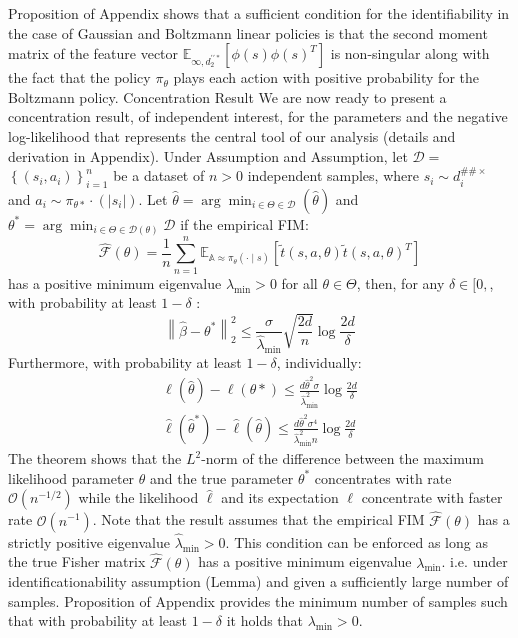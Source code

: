 \documentclass{article}
\begin{document}
Proposition of Appendix shows that a sufficient condition for the identifiability in the case of Gaussian and Boltzmann linear policies is that the second moment matrix of the feature vector \(\mathbb{E}_{\infty, d_{2}^{\prime \prime \ast}}\left[\phi(s) \phi(s)^{T}\right]\) is non-singular along with the fact that the policy \(\pi_{\theta}\) plays each action with positive probability for the Boltzmann policy.
Concentration Result We are now ready to present a concentration result, of independent interest, for the parameters and the negative log-likelihood that represents the central tool of our analysis (details and derivation in Appendix).
Under Assumption and Assumption, let \(\mathcal{D}=\) \(\left\{\left(s_{i}, a_{i}\right)\right\}_{i=1}^{n}\) be a dataset of \(n>0\) independent samples, where \(s_{i} \sim d_{i}^{\# \# \times}\) and \(a_{i} \sim \pi_{\theta *} \cdot\left(\left|s_{i}\right|\right)\). Let \(\hat{\theta}=\arg \min _{i \in \Theta \in \mathcal{D}}(\hat{\theta})\) and \(\theta^{*}=\arg \min _{i \in \Theta \in \mathcal{D}(\theta)} \mathcal{D}\) if the empirical FIM:
\[
\widehat{\mathcal{F}}(\theta)=\frac{1}{n} \sum_{n=1}^{n} \mathbb{E}_{\mathbb{A} \approx \pi_{\theta}(\cdot \mid s)}\left[\tilde{t}(s, a, \theta) \tilde{t}(s, a, \theta)^{T}\right]
\]
has a positive minimum eigenvalue \(\hat{\lambda}_{\min }>0\) for all \(\theta \in \Theta\), then, for any \(\delta \in[0,\), with probability at least \(1-\delta\) :
\[
\left\|\hat{\beta}-\theta^{*}\right\|_{2}^{2} \leq \frac{\sigma}{\hat{\lambda}_{\min }} \sqrt{\frac{2 d}{n}} \log \frac{2 d}{\delta}
\]
Furthermore, with probability at least \(1-\delta\), individually:
\[
\begin{array}{l}
\ell(\hat{\theta})-\ell(\theta *) \leqslant \frac{d \hat{\theta}^{2} \sigma}{\hat{\lambda}_{\min }^{2}} \log \frac{2 d}{\delta} \\
\widehat{\ell}(\hat{\theta}^{*})-\widehat{\ell}(\hat{\theta}) \leqslant \frac{d \hat{\theta}^{2} \sigma^{4}}{\hat{\lambda}_{\min }^{2} n} \log \frac{2 d}{\delta}
\end{array}
\]
The theorem shows that the \(L^{2}\)-norm of the difference between the maximum likelihood parameter \(\theta\) and the true parameter \(\theta^{*}\) concentrates with rate \(\mathcal{O}\left(n^{-1 / 2}\right)\) while the likelihood \(\hat{\ell}\) and its expectation \(\ell\) concentrate with faster rate \(\mathcal{O}\left(n^{-1}\right)\). Note that the result assumes that the empirical FIM \(\widehat{\mathcal{F}}(\theta)\) has a strictly positive eigenvalue \(\hat{\lambda}_{\min }>0\). This condition can be enforced as long as the true Fisher matrix \(\widehat{\mathcal{F}}(\theta)\) has a positive minimum eigenvalue \(\lambda_{\min }\). i.e. under identificationability assumption (Lemma) and given a sufficiently large number of samples. Proposition of Appendix provides the minimum number of samples such that with probability at least \(1-\delta\) it holds that \(\lambda_{\min }>0\).
\end{document}
